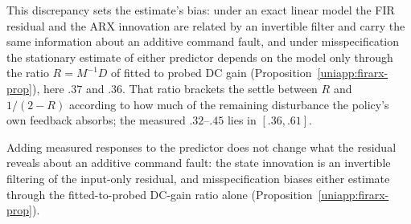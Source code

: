 
This discrepancy sets the estimate's bias: under an exact linear model the FIR
residual and the ARX innovation are related by an invertible filter and carry
the same information about an additive command fault, and under
misspecification the stationary estimate of either predictor depends on the
model only through the ratio $R=M^{-1}D$ of fitted to probed DC gain
(Proposition~\ref{uniapp:firarx-prop}), here $.37$ and $.36$. That ratio
brackets the settle between $R$ and $1/(2-R)$ according to how much of the
remaining disturbance the policy's own feedback absorbs; the measured
$.32$--$.45$ lies in $[.36,.61]$.

Adding measured responses to the predictor does not change what the residual
reveals about an additive command fault: the state innovation is an invertible
filtering of the input-only residual, and misspecification biases either
estimate through the fitted-to-probed DC-gain ratio alone
(Proposition~\ref{uniapp:firarx-prop}).
